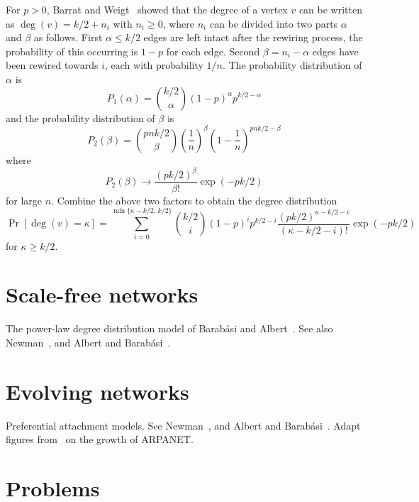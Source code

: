 For $p > 0$, Barrat and Weigt~\cite{BarratWeigt2000} showed that the
degree of a vertex $v$ can be written as $\deg(v) = k/2 + n_i$ with
$n_i \geq 0$, where $n_i$ can be divided into two parts $\alpha$ and
$\beta$ as follows. First $\alpha \leq k/2$ edges are left intact
after the rewiring process, the probability of this occurring is
$1 - p$ for each edge. Second $\beta = n_i - \alpha$ edges have been
rewired towards $i$, each with probability $1/n$. The probability
distribution of $\alpha$ is
\[
P_1(\alpha)
=
\binom{k/2}{\alpha} (1 - p)^\alpha p^{k/2 - \alpha}
\]
and the probability distribution of $\beta$ is
\[
P_2(\beta)
=
\binom{pnk/2}{\beta} \left( \frac{1}{n} \right)^\beta
\left( 1 - \frac{1}{n} \right)^{pnk/2 - \beta}
\]
where
\[
P_2(\beta)
\to
\frac{(pk/2)^\beta}{\beta!} \exp(-pk/2)
\]
for large $n$. Combine the above two factors to obtain the degree
distribution
\[
\Pr[\deg(v) = \kappa]
=
\sum_{i=0}^{\min\{\kappa - k/2,\, k/2\}}
\binom{k/2}{i} (1 - p)^i p^{k/2 - i}
\frac{(pk/2)^{\kappa - k/2 - i}} {(\kappa - k/2 - i)!}
\exp(-pk/2)
\]
for $\kappa \geq k/2$.



\section{Scale-free networks}

The power-law degree distribution model of Barab{\'a}si and
Albert~\cite{BarabasiAlbert1999}. See also Newman~\cite{Newman2003b},
and Albert and Barab{\'a}si~\cite{AlbertBarabasi2002}.



\section{Evolving networks}

Preferential attachment models. See Newman~\cite{Newman2003b},
and Albert and Barab{\'a}si~\cite{AlbertBarabasi2002}. Adapt figures
from~\cite{HeartEtAl1978} on the growth of ARPANET.



\section{Problems}

